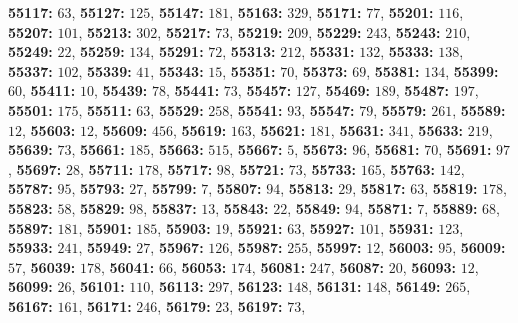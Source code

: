 \textsf{\bfseries 55117:} $63$, \textsf{\bfseries 55127:} $125$, \textsf{\bfseries 55147:} $181$, \textsf{\bfseries 55163:} $329$, \textsf{\bfseries 55171:} $77$, \textsf{\bfseries 55201:} $116$, \textsf{\bfseries 55207:} $101$, \textsf{\bfseries 55213:} $302$, \textsf{\bfseries 55217:} $73$, \textsf{\bfseries 55219:} $209$, \textsf{\bfseries 55229:} $243$, \textsf{\bfseries 55243:} $210$, \textsf{\bfseries 55249:} $22$, \textsf{\bfseries 55259:} $134$, \textsf{\bfseries 55291:} $72$, \textsf{\bfseries 55313:} $212$, \textsf{\bfseries 55331:} $132$, \textsf{\bfseries 55333:} $138$, \textsf{\bfseries 55337:} $102$, \textsf{\bfseries 55339:} $41$, \textsf{\bfseries 55343:} $15$, \textsf{\bfseries 55351:} $70$, \textsf{\bfseries 55373:} $69$, \textsf{\bfseries 55381:} $134$, \textsf{\bfseries 55399:} $60$, \textsf{\bfseries 55411:} $10$, \textsf{\bfseries 55439:} $78$, \textsf{\bfseries 55441:} $73$, \textsf{\bfseries 55457:} $127$, \textsf{\bfseries 55469:} $189$, \textsf{\bfseries 55487:} $197$, \textsf{\bfseries 55501:} $175$, \textsf{\bfseries 55511:} $63$, \textsf{\bfseries 55529:} $258$, \textsf{\bfseries 55541:} $93$, \textsf{\bfseries 55547:} $79$, \textsf{\bfseries 55579:} $261$, \textsf{\bfseries 55589:} $12$, \textsf{\bfseries 55603:} $12$, \textsf{\bfseries 55609:} $456$, \textsf{\bfseries 55619:} $163$, \textsf{\bfseries 55621:} $181$, \textsf{\bfseries 55631:} $341$, \textsf{\bfseries 55633:} $219$, \textsf{\bfseries 55639:} $73$, \textsf{\bfseries 55661:} $185$, \textsf{\bfseries 55663:} $515$, \textsf{\bfseries 55667:} $5$, \textsf{\bfseries 55673:} $96$, \textsf{\bfseries 55681:} $70$, \textsf{\bfseries 55691:} $97$, \textsf{\bfseries 55697:} $28$, \textsf{\bfseries 55711:} $178$, \textsf{\bfseries 55717:} $98$, \textsf{\bfseries 55721:} $73$, \textsf{\bfseries 55733:} $165$, \textsf{\bfseries 55763:} $142$, \textsf{\bfseries 55787:} $95$, \textsf{\bfseries 55793:} $27$, \textsf{\bfseries 55799:} $7$, \textsf{\bfseries 55807:} $94$, \textsf{\bfseries 55813:} $29$, \textsf{\bfseries 55817:} $63$, \textsf{\bfseries 55819:} $178$, \textsf{\bfseries 55823:} $58$, \textsf{\bfseries 55829:} $98$, \textsf{\bfseries 55837:} $13$, \textsf{\bfseries 55843:} $22$, \textsf{\bfseries 55849:} $94$, \textsf{\bfseries 55871:} $7$, \textsf{\bfseries 55889:} $68$, \textsf{\bfseries 55897:} $181$, \textsf{\bfseries 55901:} $185$, \textsf{\bfseries 55903:} $19$, \textsf{\bfseries 55921:} $63$, \textsf{\bfseries 55927:} $101$, \textsf{\bfseries 55931:} $123$, \textsf{\bfseries 55933:} $241$, \textsf{\bfseries 55949:} $27$, \textsf{\bfseries 55967:} $126$, \textsf{\bfseries 55987:} $255$, \textsf{\bfseries 55997:} $12$, \textsf{\bfseries 56003:} $95$, \textsf{\bfseries 56009:} $57$, \textsf{\bfseries 56039:} $178$, \textsf{\bfseries 56041:} $66$, \textsf{\bfseries 56053:} $174$, \textsf{\bfseries 56081:} $247$, \textsf{\bfseries 56087:} $20$, \textsf{\bfseries 56093:} $12$, \textsf{\bfseries 56099:} $26$, \textsf{\bfseries 56101:} $110$, \textsf{\bfseries 56113:} $297$, \textsf{\bfseries 56123:} $148$, \textsf{\bfseries 56131:} $148$, \textsf{\bfseries 56149:} $265$, \textsf{\bfseries 56167:} $161$, \textsf{\bfseries 56171:} $246$, \textsf{\bfseries 56179:} $23$, \textsf{\bfseries 56197:} $73$, 
